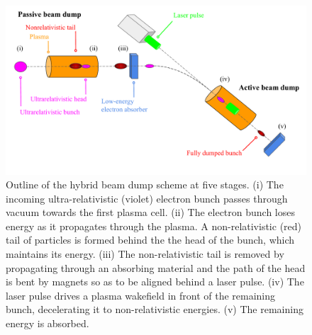 


\begin{figure}
\centering
\includegraphics[width=\textwidth]{hybrid_outline5.pdf} %
\caption{\small{Outline of the hybrid beam dump scheme at five stages. (i) The incoming ultra-relativistic (violet) electron bunch passes through vacuum towards the first plasma cell. (ii) The electron bunch loses energy as it propagates through the plasma. A non-relativistic (red) tail of particles is formed behind the the head of the bunch, which maintains its energy. (iii) The non-relativistic tail is removed by propagating through an absorbing material and the path of the head is bent by magnets so as to be aligned behind a laser pulse. (iv) The laser pulse drives a plasma wakefield in front of the remaining bunch, decelerating it to non-relativistic energies. (v) The remaining energy is absorbed.}} %
\label{hybrid_outline}
\end{figure}
